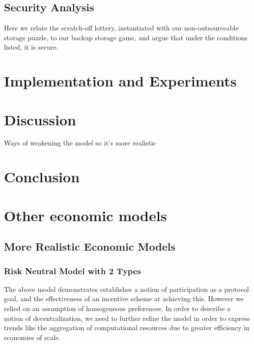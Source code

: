 \documentclass[]{article}
\theoremstyle{remark}
\begin{document}
\subsection{Security Analysis}

Here we relate the scratch-off lottery, instantiated with our non-outsourceable storage puzzle, to our backup storage game, and argue that under the conditions listed, it is secure.

\section{Implementation and Experiments}

\section{Discussion}
Ways of weakening the model so it's more realistic

\section{Conclusion}








\appendix


\section{Other economic models}



\subsection{More Realistic Economic Models}

\subsubsection{Risk Neutral Model with 2 Types}

The above model demonstrates establishes a notion of participation as a protocol goal, and the effectiveness of an incentive scheme at achieving this. However we relied on an assumption of homogeneous preferences. In order to describe a notion of decentralization, we need to further refine the model in order to express trends like the aggregation of computational resources due to greater efficiency in economies of scale.
\end{document}
